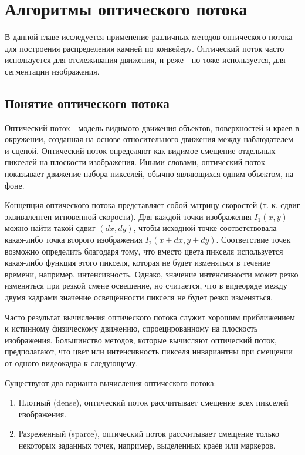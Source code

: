 \documentclass[times]{itmo-student-thesis}
\begin{document}
\chapter{Алгоритмы оптического потока}
В данной главе исследуется применение различных методов оптического потока для построения распределения камней по конвейеру. Оптический поток часто используется для отслеживания движения, и реже - но тоже используется, для сегментации изображения. 
\section{Понятие оптического потока}
Оптический поток  - модель видимого движения объектов, поверхностей и краев в окружении,  созданная на основе относительного движения между наблюдателем и сценой. 
Оптический поток определяют как видимое смещение отдельных пикселей на плоскости изображения. Иными словами, оптический поток показывает движение набора пикселей, обычно являющихся одним объектом, на фоне. 

Концепция оптического потока представляет собой матрицу скоростей (т. к. сдвиг  эквивалентен мгновенной скорости). Для каждой точки изображения $I_{1}(x,y)$ можно найти такой сдвиг $(dx, dy)$, чтобы исходной точке соответствовала какая-либо точка второго изображения $I_{2}(x+dx,y+dy)$.
Соответствие точек возможно определить благодаря тому, что вместо цвета пикселя используется какая-либо функция этого пикселя, которая не будет изменяться в течение времени, например, интенсивность. Однако, значение интенсивности может резко изменяться при резкой смене освещение, но считается, что в видеоряде между двумя кадрами значение освещённости пикселя не будет резко изменяться.

Часто результат вычисления оптического потока служит хорошим приближением к истинному физическому движению, спроецированному на плоскость изображения. Большинство методов, которые вычисляют оптический поток, предполагают, что цвет или интенсивность пикселя инвариантны при смещении от одного видеокадра к следующему. 

Существуют два варианта вычисления оптического потока:
\begin{enumerate}
	\item Плотный (dense), оптический поток рассчитывает смещение всех пикселей изображения.
	\item Разреженный (sparce), оптический поток рассчитывает смещение только некоторых заданных точек, например, выделенных краёв или маркеров.
\end{enumerate}
\end{document}
